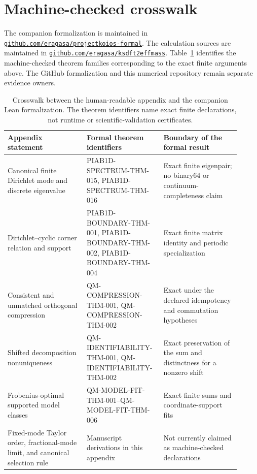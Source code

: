 \documentclass[11pt]{article}
\newcommand{\code}[1]{\texttt{#1}}
\begin{document}
\section{Machine-checked crosswalk}
\label{app:formal-crosswalk}

The companion formalization is maintained in
\href{https://github.com/eragasa/projectkoios-formal}{
\code{github.com/eragasa/projectkoios-formal}}. The calculation sources are maintained
in
\href{https://github.com/eragasa/ksdft2effmass}{
\code{github.com/eragasa/ksdft2effmass}}. Table~\ref{tab:formal-crosswalk} identifies
the machine-checked theorem families corresponding to the exact finite arguments
above. The GitHub formalization and this numerical repository remain separate evidence
owners.

\begin{table}[!htbp]
\centering
\small
\begin{tabular}{@{}
>{\raggedright\arraybackslash}p{0.32\linewidth}
>{\raggedright\arraybackslash}p{0.28\linewidth}
>{\raggedright\arraybackslash}p{0.31\linewidth}@{}}
\toprule
Appendix statement & Formal theorem identifiers & Boundary of the formal result \\
\midrule
Canonical finite Dirichlet mode and discrete eigenvalue
 & PIAB1D-SPECTRUM-THM-015, PIAB1D-SPECTRUM-THM-016
 & Exact finite eigenpair; no binary64 or continuum-completeness claim \\
Dirichlet--cyclic corner relation and support
 & PIAB1D-BOUNDARY-THM-001, PIAB1D-BOUNDARY-THM-002,
   PIAB1D-BOUNDARY-THM-004
 & Exact finite matrix identity and periodic specialization \\
Consistent and unmatched orthogonal compression
 & QM-COMPRESSION-THM-001, QM-COMPRESSION-THM-002
 & Exact under the declared idempotency and commutation hypotheses \\
Shifted decomposition nonuniqueness
 & QM-IDENTIFIABILITY-THM-001, QM-IDENTIFIABILITY-THM-002
 & Exact preservation of the sum and distinctness for a nonzero shift \\
Frobenius-optimal supported model classes
 & QM-MODEL-FIT-THM-001--QM-MODEL-FIT-THM-006
 & Exact finite sums and coordinate-support fits \\
Fixed-mode Taylor order, fractional-mode limit, and canonical selection rule
 & Manuscript derivations in this appendix
 & Not currently claimed as machine-checked declarations \\
\bottomrule
\end{tabular}
\caption{Crosswalk between the human-readable appendix and the companion Lean
formalization. The theorem identifiers name exact finite declarations, not runtime or
scientific-validation certificates.}
\label{tab:formal-crosswalk}
\end{table}
\end{document}
